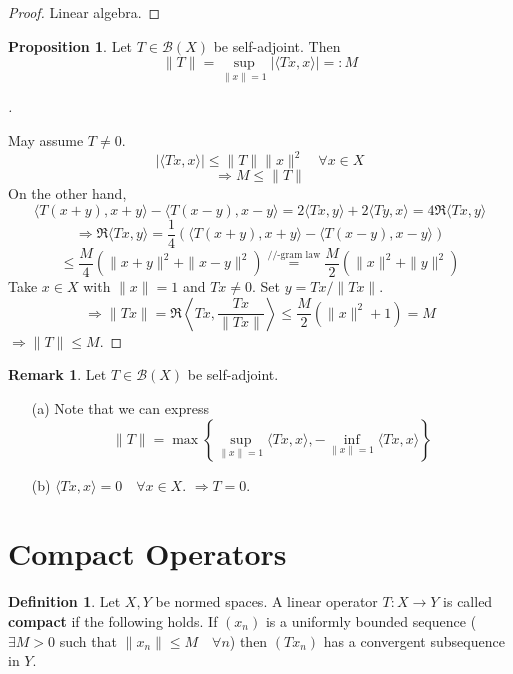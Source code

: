 \documentclass{article}
\theoremstyle{definition}
\newtheorem{dfn}{Definition}
\newtheorem{rem}{Remark}
\newtheorem{prop}{Proposition}
\newenvironment{proofs}[1][\proofname]{%
  \begin{proof}[#1]$ $\par\nobreak\ignorespaces
}{%
  \end{proof}
}
\newcommand{\B}{\mathcal B}
\begin{document}
\begin{proof}
	Linear algebra.
\end{proof}

\begin{prop}
	Let $T \in \B(X)$ be self-adjoint.
	Then 
	\[
		\|T\| = \sup_{\|x\| = 1} |\langle T x, x\rangle| =: M
	\]
\end{prop}

\begin{proofs}
	May assume $T \neq 0$.
	\[
		|\langle T x, x \rangle| \leq \|T\|\|x\|^2 \quad \forall x \in X
	\]
	\[
		\Rightarrow M \leq \|T\|
	\]
	On the other hand, 
	\[
		\langle T(x + y), x + y \rangle - \langle T(x - y), x - y \rangle = 2 \langle T x, y \rangle + 2 \langle T y, x \rangle = 4 \Re \langle T x, y \rangle
	\]
	\[
		\Rightarrow \Re \langle T x, y \rangle = \frac{1}{4} ( \langle T (x + y), x + y \rangle - \langle T(x - y), x - y \rangle ) 
	\]
	\[
		\leq \frac{M}{4} ( \|x + y\|^2 + \|x - y\|^2) \stackrel{\text{//-gram law}}{=} \frac{M}{2} (\|x\|^2 + \|y\|^2)
	\]
	Take $x \in X$ with $\|x\| = 1$ and $T x \neq 0$.
	Set $y = Tx/\|T x\|$.
	\[
		\Rightarrow \|T x\| = \Re \left\langle Tx, \frac{T x}{\|T x\|} \right\rangle \leq \frac{M}{2} (\|x\|^2 + 1) = M
	\]
	$\Rightarrow \|T\| \leq M$.
\end{proofs}

\begin{rem}
	Let $T \in \B(X)$ be self-adjoint.
	\begin{enumerate}
		\item[(a)] Note that we can express
			\[
				\|T\| = \max \left\{ \sup_{\|x\| = 1} \langle T x, x \rangle, - \inf_{\|x\| = 1} \langle T x, x \rangle \right\}
			\]
			
		\item[(b)] $\langle T x, x \rangle = 0 \quad \forall x \in X$.
			$\Rightarrow T = 0$.

	\end{enumerate}
\end{rem}

\section{Compact Operators}

\begin{dfn}
	Let $X, Y$ be normed spaces.
	A linear operator $T: X \to Y$ is called \textbf{compact} if the following holds.
	If $(x_n)$ is a uniformly bounded sequence ($\exists M > 0$ such that $\|x_n\| \leq M \quad \forall n$) then $(T x_n)$ has a convergent subsequence in $Y$.
\end{dfn}
\end{document}
